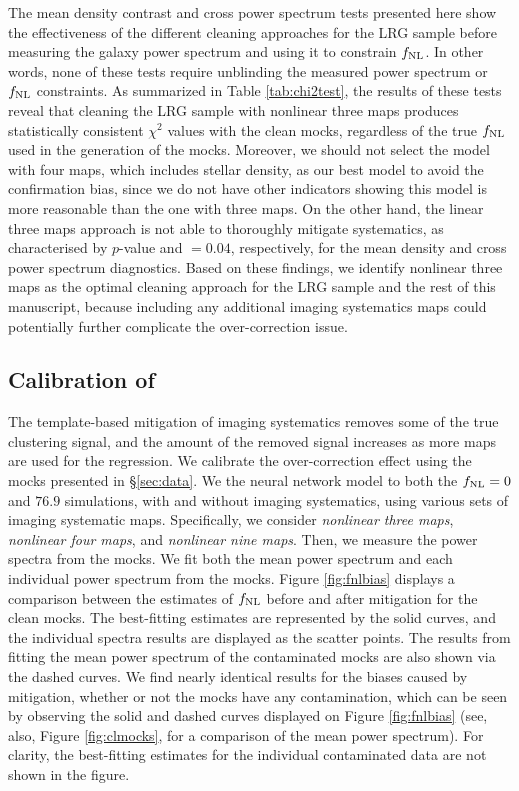 The mean density contrast and cross power spectrum tests presented here show the effectiveness of the different cleaning approaches for the LRG sample before measuring the galaxy power spectrum and using it to constrain $f_{\rm NL}$. In other words, none of these tests require unblinding the measured power spectrum or $f_{\rm NL}$ constraints. As summarized in Table \ref{tab:chi2test}, the results of these tests reveal that cleaning the LRG sample with nonlinear three maps produces statistically consistent $\chi^{2}$ values with the clean mocks, regardless of the true $f_{\rm NL}$ used in the generation of the mocks.  Moreover, we should not select the model with four maps, which includes stellar density, as our best model to avoid the confirmation bias, since we do not have other indicators showing this model is more reasonable than the one with three maps. On the other hand,  the linear three maps approach is not able to thoroughly mitigate systematics, as characterised by $p$-value  and $=0.04$, respectively, for the mean density and cross power spectrum diagnostics. Based on these findings, we identify nonlinear three maps as the optimal cleaning approach for the LRG sample and the rest of this manuscript, because including any additional imaging systematics maps could potentially further complicate the over-correction issue.


\subsection{Calibration of  }\label{ssec:calibration}

The template-based mitigation of imaging systematics removes some of the true clustering signal, and the amount of the removed signal increases as more maps are used for the regression. We calibrate the over-correction effect using the mocks presented in \S \ref{sec:data}. We  the neural network model to both the $f_{\rm NL}=0$ and $76.9$ simulations, with and without imaging systematics, using various sets of imaging systematic maps. Specifically, we consider \textit{nonlinear three maps}, \textit{nonlinear four maps}, and \textit{nonlinear nine maps}. Then, we measure the power spectra from the mocks. We fit both the mean power spectrum and each individual power spectrum from the mocks. Figure \ref{fig:fnlbias} displays a comparison between the estimates of $f_{\rm NL}$ before and after mitigation for the clean mocks. The best-fitting estimates are represented by the solid curves, and the individual spectra results are displayed as the scatter points. The results from fitting the mean power spectrum of the contaminated mocks are also shown via the dashed curves. We find nearly identical results for the biases caused by mitigation, whether or not the mocks have any contamination, which can be seen by observing the solid and dashed curves displayed on Figure \ref{fig:fnlbias} (see, also, Figure \ref{fig:clmocks}, for a comparison of the mean power spectrum). For clarity, the best-fitting estimates for the individual contaminated data are not shown in the figure.


